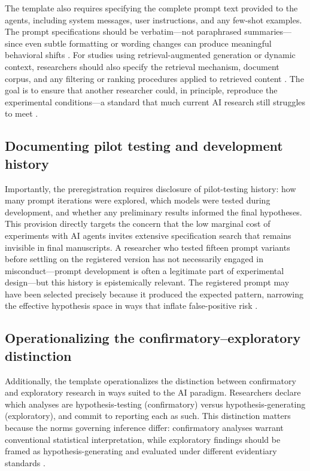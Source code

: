 \documentclass{article}
\theoremstyle{plain}
\theoremstyle{definition}
\theoremstyle{remark}
\begin{document}
The template also requires specifying the complete prompt text provided to the agents, including system messages, user instructions, and any few-shot examples. The prompt specifications should be verbatim---not paraphrased summaries---since even subtle formatting or wording changes can produce meaningful behavioral shifts \citep{sclar2024quantifying, oh2025moralrobustness}. For studies using retrieval-augmented generation or dynamic context, researchers should also specify the retrieval mechanism, document corpus, and any filtering or ranking procedures applied to retrieved content \citep{lewis2020rag}. The goal is to ensure that another researcher could, in principle, reproduce the experimental conditions---a standard that much current AI research still struggles to meet \citep{gundersen2018state,pineau2021reproducibility,hutson2018artificial,henderson2018deep}.

\subsection{Documenting pilot testing and development history}

Importantly, the preregistration requires disclosure of pilot-testing history: how many prompt iterations were explored, which models were tested during development, and whether any preliminary results informed the final hypotheses. This provision directly targets the concern that the low marginal cost of experiments with AI agents invites extensive specification search that remains invisible in final manuscripts. A researcher who tested fifteen prompt variants before settling on the registered version has not necessarily engaged in misconduct---prompt development is often a legitimate part of experimental design---but this history is epistemically relevant. The registered prompt may have been selected precisely because it produced the expected pattern, narrowing the effective hypothesis space in ways that inflate false-positive risk \citep{simmons2011falsepositive,gelman2013forkingpaths}.

\subsection{Operationalizing the confirmatory--exploratory distinction}

Additionally, the template operationalizes the distinction between confirmatory and exploratory research in ways suited to the AI paradigm. Researchers declare which analyses are hypothesis-testing (confirmatory) versus hypothesis-generating (exploratory), and commit to reporting each as such. This distinction matters because the norms governing inference differ: confirmatory analyses warrant conventional statistical interpretation, while exploratory findings should be framed as hypothesis-generating and evaluated under different evidentiary standards \citep{wagenmakers2012agenda}.
\end{document}
